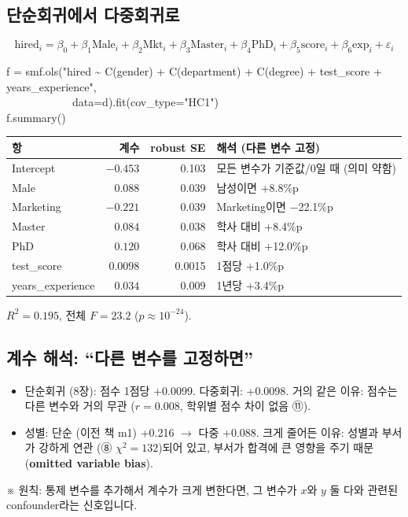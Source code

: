 \documentclass[11pt,a4paper]{article}
\newcommand{\term}[1]{\textbf{#1}}
\newcommand{\aside}[1]{{\footnotesize\color{black!65}#1}}
\begin{document}
\subsection{단순회귀에서 다중회귀로}
\[
\text{hired}_i=\beta_0+\beta_1\text{Male}_i+\beta_2\text{Mkt}_i+\beta_3\text{Master}_i+\beta_4\text{PhD}_i+\beta_5\text{score}_i+\beta_6\text{exp}_i+\varepsilon_i
\]
\begin{codebox}
f = smf.ols("hired \~{} C(gender) + C(department) + C(degree) + test\_score + years\_experience",\\
\ \ \ \ \ \ \ \ \ \ \ \ data=d).fit(cov\_type="HC1")\\
f.summary()
\end{codebox}
\begin{center}
\begin{tabular}{@{}l r r l@{}}
\toprule
항 & 계수 & robust SE & 해석 (다른 변수 고정) \\
\midrule
Intercept & $-0.453$ & 0.103 & 모든 변수가 기준값/0일 때 (의미 약함) \\
Male & $0.088$ & 0.039 & 남성이면 +8.8\%p \\
Marketing & $-0.221$ & 0.039 & Marketing이면 $-$22.1\%p \\
Master & $0.084$ & 0.038 & 학사 대비 +8.4\%p \\
PhD & $0.120$ & 0.068 & 학사 대비 +12.0\%p \\
test\_score & $0.0098$ & 0.0015 & 1점당 +1.0\%p \\
years\_experience & $0.034$ & 0.009 & 1년당 +3.4\%p \\
\bottomrule
\end{tabular}
\end{center}
$R^2=0.195$, 전체 $F=23.2$ ($p\approx10^{-24}$).

\subsection{계수 해석: ``다른 변수를 고정하면''}
\begin{itemize}
\item 단순회귀 (8장): 점수 1점당 +0.0099. 다중회귀: +0.0098. 거의 같은 이유: 점수는 다른 변수와 거의 무관 ($r=0.008$, 학위별 점수 차이 없음 ⑪).
\item 성별: 단순 (이전 책 m1) +0.216 $\to$ 다중 +0.088. 크게 줄어든 이유: 성별과 부서가 강하게 연관 (⑧ $\chi^2=132$)되어 있고, 부서가 합격에 큰 영향을 주기 때문 (\term{omitted variable bias}).
\end{itemize}
\aside{※ 원칙: 통제 변수를 추가해서 계수가 크게 변한다면, 그 변수가 $x$와 $y$ 둘 다와 관련된 confounder라는 신호입니다.}
\end{document}
